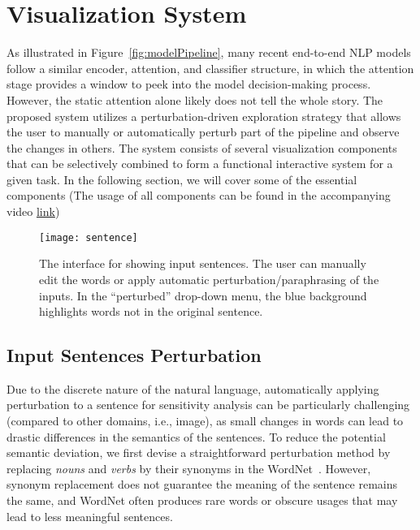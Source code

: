 
\section{Visualization System}
As illustrated in Figure~\ref{fig:modelPipeline}, many recent end-to-end NLP models follow a similar encoder, attention, and classifier structure, in which the attention stage provides a window to peek into the model decision-making process. 
However, the static attention alone likely does not tell the whole story. 
The proposed system utilizes a perturbation-driven exploration strategy that allows the user to manually or automatically perturb part of the pipeline and observe the changes in others.
%
The system consists of several visualization components that can be selectively combined to form a functional interactive system for a given task. In the following section, we will cover some of the essential components (The usage of all components can be found in the accompanying video \href{https://www.youtube.com/watch?v=dcpTyWfBhp0}{link})

\begin{figure}[htbp]
\centering
\vspace{-2mm}
 \texttt{[image: sentence]}
 \vspace{-2mm}
 \caption{
The interface for showing input sentences. The user can manually edit the words or apply automatic perturbation/paraphrasing of the inputs. In the ``perturbed'' drop-down menu, the blue background highlights words not in the original sentence.
 }
 \vspace{-1mm}
\label{fig:sentence}
\end{figure}

\subsection{Input Sentences Perturbation}
\label{sec:perturb}
Due to the discrete nature of the natural language, automatically applying perturbation to a sentence for sensitivity analysis can be particularly challenging (compared to other domains, i.e., image), as small changes in words can lead to drastic differences in the semantics of the sentences.
To reduce the potential semantic deviation, we first devise a straightforward perturbation method by replacing \emph{nouns} and \emph{verbs} by their synonyms in the WordNet~\cite{Miller1995}. However, synonym replacement does not guarantee the meaning of the sentence remains the same, and  \the WordNet often produces rare words or obscure usages that may lead to less meaningful sentences.

